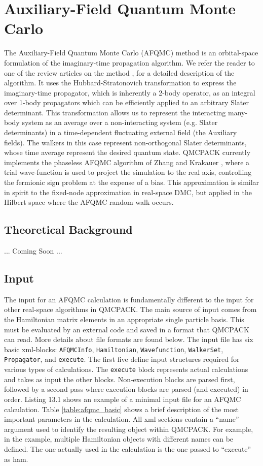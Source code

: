 \chapter{Auxiliary-Field Quantum Monte Carlo}
\label{chap:afqmc}
The Auxiliary-Field Quantum Monte Carlo (AFQMC) method is an orbital-space formulation of the imaginary-time propagation algorithm. We refer the reader to one of the review articles on the method \cite{AFQMC_review,PhysRevLett.90.136401,PhysRevE.70.056702}, for a detailed description of the algorithm. It uses the Hubbard-Stratonovich transformation to express the imaginary-time propagator, which is inherently a 2-body operator, as an integral over 1-body propagators which can be efficiently applied to an arbitrary Slater determinant. This transformation allows us to represent the interacting many-body system as an average over a non-interacting system (e.g. Slater determinants) in a time-dependent fluctuating external field (the Auxiliary fields). The walkers in this case represent non-orthogonal Slater determinants, whose time average represent the desired quantum state. QMCPACK currently implements the phaseless AFQMC algorithm of Zhang and Krakauer \cite{PhysRevLett.90.136401}, where a trial wave-function is used to project the simulation to the real axis, controlling the fermionic sign problem at the expense of a bias. This approximation is similar in spirit to the fixed-node approximation in real-space DMC, but applied in the Hilbert space where the AFQMC random walk occurs.     

\section{Theoretical Background}
... Coming Soon ...

\section{Input}

The input for an AFQMC calculation is fundamentally different to the input for other real-space algorithms in QMCPACK. The main source of input comes from the Hamiltonian matrix elements in an appropriate single particle basis. This must be evaluated by an external code and saved in a format that QMCPACK can read. More details about file formats are found below. The input file has six basic xml-blocks: \texttt{AFQMCInfo}, \texttt{Hamiltonian}, \texttt{Wavefunction}, \texttt{WalkerSet}, \texttt{Propagator}, and \texttt{execute}. The first five define input structures required for various types of calculations. The \texttt{execute} block represents actual calculations and takes as input the other blocks. 
Non-execution blocks are parsed first, followed by a second pass where execution blocks are parsed (and executed) in order. Listing 13.1 shows an example of a minimal input file for an AFQMC calculation. Table \ref{table:afqmc_basic} shows a brief description of the most important parameters in the calculation. All xml sections contain a ``name'' argument used to identify the resulting object within QMCPACK. For example, in the example, multiple Hamiltonian objects with different names can be defined. The one actually used in the calculation is the one passed to ``execute'' as ham.

